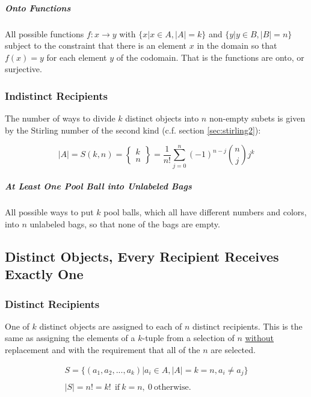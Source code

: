 \subparagraph{Onto Functions} All possible functions $f:x \rightarrow y$ with $\{x | x\in A, |A| = k \}$ and $\{y | y\in B, |B| = n\}$ subject to the constraint that there is an element $x$ in the domain so that $f(x)=y$ for each element $y$ of the codomain. That is the functions are onto, or surjective.


\subsubsection{Indistinct Recipients}
The number of ways to divide $k$ distinct objects into $n$ non-empty subets is given by the Stirling number of the second kind (c.f. section \ref{sec:stirling2}):

\begin{equation}
|A| = S(k,n) = \left\{ \begin{array}{c} k \\n \end{array} \right\} = \frac{1}{n!}\sum_{j=0}^n (-1)^{n-j} {n \choose j }j^k	\end{equation}



\subparagraph{At Least One Pool Ball into Unlabeled Bags} All possible ways to put $k$ pool balls, which all have different numbers and colors, into $n$ unlabeled bags, so that none of the bags are empty. 


\subsection{Distinct Objects, Every Recipient Receives Exactly One}

\subsubsection{Distinct Recipients}
One of $k$ distinct objects are assigned to each of $n$ distinct recipients. This is the same as assigning the elements of a $k$-tuple from a selection of $n$ \underline{without} replacement and with the requirement that all of the $n$ are selected.

\begin{equation}	
\begin{array}{l}
S = \{ (a_1,a_2,...,a_k) | a_i \in A, |A| = k = n, a_i\neq a_j\}\\
\\
|S| = n! = k!\ \ \mathrm{if\ }k=n,\ 0\ \mathrm{otherwise.}
\end{array}
\end{equation}

